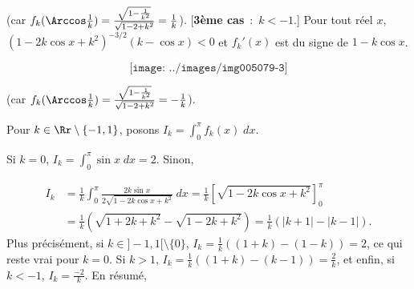 {\begin{enumerate}
{\begin{itemize}
(car $f_k(\Arccos\frac{1}{k})=\frac{\sqrt{1-\frac{1}{k^2}}}{\sqrt{1-2+k^2}}=\frac{1}{k}$).
[\textbf{3ème cas}~:~$k<-1$.] Pour tout réel $x$, $(1-2k\cos x+k^2)^{-3/2}(k-\cos x)<0$ et $f_k'(x)$ est du signe de
$1-k\cos x$.

$$\texttt{[image: ../images/img005079-3]}$$



(car $f_k(\Arccos\frac{1}{k})=\frac{\sqrt{1-\frac{1}{k^2}}}{\sqrt{1-2+k^2}}=-\frac{1}{k}$).

\end{itemize}
Pour $k\in\Rr\setminus\{-1,1\}$, posons $I_k=\int_{0}^{\pi}f_k(x)\;dx$.

Si $k=0$, $I_k=\int_{0}^{\pi}\sin x\;dx=2$. Sinon,

\begin{align*}
I_k&=\frac{1}{k}\int_{0}^{\pi}\frac{2k\sin x}{2\sqrt{1-2k\cos x+k^2}}\;dx=\frac{1}{k}
\left[\sqrt{1-2k\cos x+k^2}\right]_0^\pi\\
 &=\frac{1}{k}(\sqrt{1+2k+k^2}-\sqrt{1-2k+k^2})=\frac{1}{k}(|k+1|-|k-1|).
\end{align*}
Plus précisément, si $k\in]-1,1[\setminus\{0\}$, $I_k=\frac{1}{k}((1+k)-(1-k))=2$, ce qui reste vrai pour $k=0$. Si
$k>1$, $I_k=\frac{1}{k}((1+k)-(k-1))=\frac{2}{k}$, et enfin, si $k<-1$, $I_k=\frac{-2}{k}$. En résumé,

\begin{center}
\shadowbox{
$\mbox{Si}\;k\in]-1,1[,\;I_k=2\;\mbox{et si}\;k\in]-\infty,-1[\cup]1,+\infty[,\;I_k=\frac{2}{|k|}.$
}
\end{center}
}
\end{enumerate}
}
